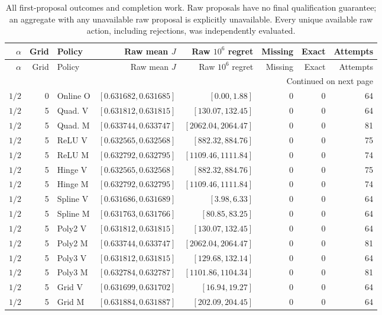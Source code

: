 \begingroup
\small\setlength{\tabcolsep}{3pt}
\begin{longtable}{rrlrrrrr}
\caption{All first-proposal outcomes and completion work. Raw proposals have no final qualification guarantee; an aggregate with any unavailable raw proposal is explicitly unavailable. Every unique available raw action, including rejections, was independently evaluated.}\label{tab:rawproposals121}\\
\toprule
$\alpha$ & Grid & Policy & Raw mean $J$ & Raw $10^6$ regret & Missing & Exact & Attempts\\
\midrule\endfirsthead
\toprule
$\alpha$ & Grid & Policy & Raw mean $J$ & Raw $10^6$ regret & Missing & Exact & Attempts\\
\midrule\endhead
\midrule\multicolumn{8}{r}{Continued on next page}\\\endfoot
\bottomrule\endlastfoot
$1/2$ & 0 & Online O & $[0.631682,0.631685]$ & $[0.00,1.88]$ & 0 & 0 & 64\\
$1/2$ & 5 & Quad. V & $[0.631812,0.631815]$ & $[130.07,132.45]$ & 0 & 0 & 64\\
$1/2$ & 5 & Quad. M & $[0.633744,0.633747]$ & $[2062.04,2064.47]$ & 0 & 0 & 81\\
$1/2$ & 5 & ReLU V & $[0.632565,0.632568]$ & $[882.32,884.76]$ & 0 & 0 & 75\\
$1/2$ & 5 & ReLU M & $[0.632792,0.632795]$ & $[1109.46,1111.84]$ & 0 & 0 & 74\\
$1/2$ & 5 & Hinge V & $[0.632565,0.632568]$ & $[882.32,884.76]$ & 0 & 0 & 75\\
$1/2$ & 5 & Hinge M & $[0.632792,0.632795]$ & $[1109.46,1111.84]$ & 0 & 0 & 74\\
$1/2$ & 5 & Spline V & $[0.631686,0.631689]$ & $[3.98,6.33]$ & 0 & 0 & 64\\
$1/2$ & 5 & Spline M & $[0.631763,0.631766]$ & $[80.85,83.25]$ & 0 & 0 & 64\\
$1/2$ & 5 & Poly2 V & $[0.631812,0.631815]$ & $[130.07,132.45]$ & 0 & 0 & 64\\
$1/2$ & 5 & Poly2 M & $[0.633744,0.633747]$ & $[2062.04,2064.47]$ & 0 & 0 & 81\\
$1/2$ & 5 & Poly3 V & $[0.631812,0.631815]$ & $[129.68,132.14]$ & 0 & 0 & 64\\
$1/2$ & 5 & Poly3 M & $[0.632784,0.632787]$ & $[1101.86,1104.34]$ & 0 & 0 & 81\\
$1/2$ & 5 & Grid V & $[0.631699,0.631702]$ & $[16.94,19.27]$ & 0 & 0 & 64\\
$1/2$ & 5 & Grid M & $[0.631884,0.631887]$ & $[202.09,204.45]$ & 0 & 0 & 64\\

\end{longtable}
